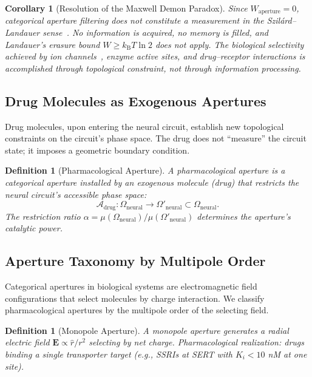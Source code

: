 \documentclass[twocolumn,10pt]{article}
\newtheorem{corollary}[theorem]{Corollary}
\newtheorem{definition}[theorem]{Definition}
\theoremstyle{remark}
\newcommand{\kB}{k_{\mathrm{B}}}
\begin{document}
\begin{corollary}[Resolution of the Maxwell Demon Paradox]
\label{cor:demon}
Since $W_{\mathrm{aperture}} = 0$, categorical aperture filtering does not constitute a measurement in the Szil\'ard--Landauer sense~\citep{szilard1929entropieverminderung,landauer1961irreversibility,bennett1982thermodynamics}. No information is acquired, no memory is filled, and Landauer's erasure bound $W \geq \kB T \ln 2$ does not apply. The biological selectivity achieved by ion channels~\citep{doyle1998structure,hille2001ion}, enzyme active sites, and drug--receptor interactions is accomplished through topological constraint, not through information processing.
\end{corollary}

\subsection{Drug Molecules as Exogenous Apertures}

Drug molecules, upon entering the neural circuit, establish new topological constraints on the circuit's phase space. The drug does not ``measure'' the circuit state; it imposes a geometric boundary condition.

\begin{definition}[Pharmacological Aperture]
\label{def:pharm_aperture}
A pharmacological aperture is a categorical aperture installed by an exogenous molecule (drug) that restricts the neural circuit's accessible phase space:
\begin{equation}
  \mathcal{A}_{\mathrm{drug}}: \Omega_{\mathrm{neural}} \to \Omega'_{\mathrm{neural}} \subset \Omega_{\mathrm{neural}}.
\end{equation}
The restriction ratio $\alpha = \mu(\Omega_{\mathrm{neural}})/\mu(\Omega'_{\mathrm{neural}})$ determines the aperture's catalytic power.
\end{definition}

\subsection{Aperture Taxonomy by Multipole Order}

Categorical apertures in biological systems are electromagnetic field configurations that select molecules by charge interaction. We classify pharmacological apertures by the multipole order of the selecting field.

\begin{definition}[Monopole Aperture]
\label{def:monopole}
A monopole aperture generates a radial electric field $\mathbf{E} \propto \hat{r}/r^2$ selecting by net charge. Pharmacological realization: drugs binding a single transporter target (e.g., SSRIs at SERT with $K_i < 10$ nM at one site).
\end{definition}
\end{document}
